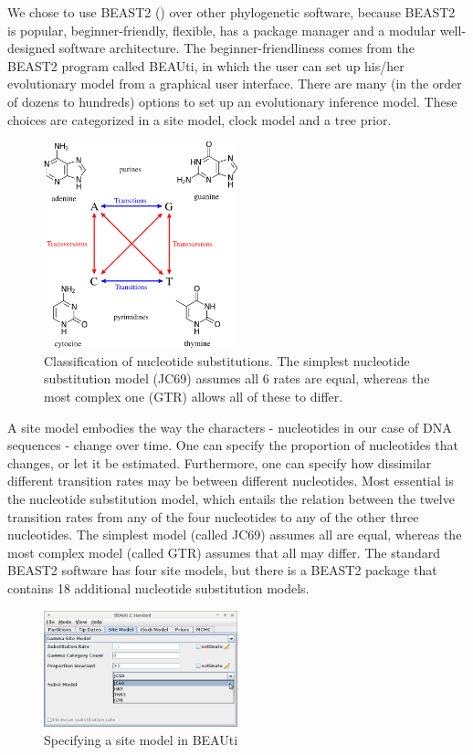 We chose to use BEAST2 (\cite{beast2}) over other phylogenetic software,
because BEAST2 is popular, beginner-friendly, flexible, has a package manager
and a modular well-designed software architecture. The beginner-friendliness
comes from the BEAST2 program called BEAUti, in which the user can set up
his/her evolutionary model from a graphical user interface. There are many (in
the order of dozens to hundreds) options to set up an evolutionary inference model. 
These choices are categorized in a site model, clock model and a tree prior. 

\begin{figure}[H]
  \includegraphics[width=0.5\textwidth]{transitions_and_transversions.png}
  \caption{
    Classification of nucleotide substitutions. The simplest nucleotide
    substitution model (JC69) assumes all 6 rates are equal, whereas
    the most complex one (GTR) allows all of these to differ.
 }
  \label{fig:dna_substitution}
\end{figure}

A site model embodies the way the characters - nucleotides in our case of DNA sequences -
change over time. One can specify the proportion of nucleotides
that changes, or let it be estimated. Furthermore, one can specify how dissimilar different transition
rates may be between different nucleotides. Most essential is the nucleotide
substitution model, which entails the relation between the twelve transition 
rates from any of the four nucleotides to any of the other three nucleotides. 
The simplest model (called
JC69) assumes all are equal, whereas the most complex model (called GTR) assumes
that all may differ. The standard BEAST2 software has four site models, but there is a BEAST2 
package that contains 18 additional nucleotide substitution models.

\begin{figure}[H]
  \includegraphics[width=0.5\textwidth]{beauti_site_model.png}
  \caption{
    Specifying a site model in BEAUti
 }
  \label{fig:beauti_site_model}
\end{figure}

